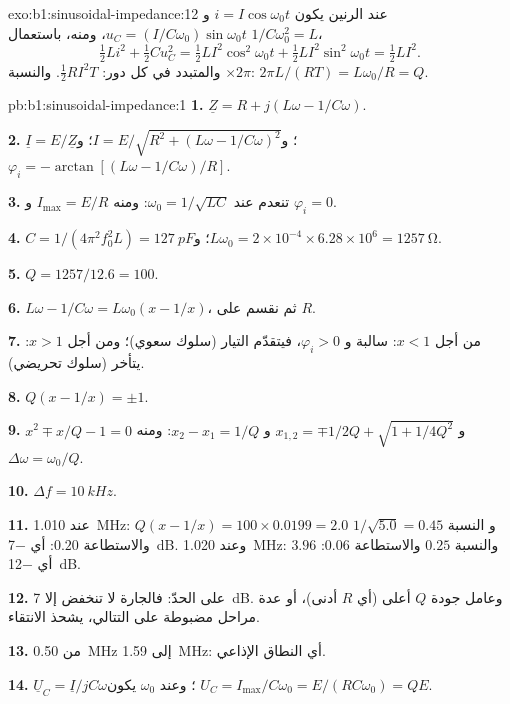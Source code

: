 \begin{solution}{exo:b1:sinusoidal-impedance:12}
عند الرنين يكون $i = I\cos\omega_0 t$ و $u_C = (I/C\omega_0)\sin\omega_0 t$،
ومنه، باستعمال $1/C\omega_0^2 = L$،
\[
\tfrac12 Li^2 + \tfrac12 Cu_C^2 = \tfrac12 LI^2\cos^2\omega_0 t
+ \tfrac12 LI^2\sin^2\omega_0 t = \tfrac12 LI^2 .
\]
والمتبدد في كل دور: $\tfrac12 RI^2T$. والنسبة $\times 2\pi$: $2\pi L/(RT)
= L\omega_0/R = Q$.
\end{solution}

\begin{solution}{pb:b1:sinusoidal-impedance:1}
\textbf{1.} $\underline Z = R + j(L\omega - 1/C\omega)$.

\textbf{2.} $\underline I = E/\underline Z$؛ و$I = E/\sqrt{R^2 + (L\omega -
1/C\omega)^2}$؛ و$\varphi_i = -\arctan[(L\omega - 1/C\omega)/R]$.

\textbf{3.} تنعدم  عند $\omega_0 = 1/\sqrt{LC}$: ومنه $I_{\max}
= E/R$ و $\varphi_i = 0$.

\textbf{4.} $C = 1/(4\pi^2f_0^2L) = \qty{127}{pF}$؛ و$L\omega_0 = 2\times10^{-4}
\times 6.28\times10^6 = \qty{1257}{\ohm}$.

\textbf{5.} $Q = 1257/12.6 = 100$.

\textbf{6.} $L\omega - 1/C\omega = L\omega_0(x - 1/x)$، ثم نقسم على $R$.

\textbf{7.} من أجل $x < 1$:  سالبة و $\varphi_i > 0$، فيتقدّم التيار
(سلوك سعوي)؛ ومن أجل $x > 1$: يتأخر (سلوك تحريضي).

\textbf{8.} $Q(x - 1/x) = \pm1$.

\textbf{9.} $x^2 \mp x/Q - 1 = 0$ و $x_{1,2} = \mp1/2Q + \sqrt{1 + 1/4Q^2}$ و
$x_2 - x_1 = 1/Q$: ومنه $\Delta\omega = \omega_0/Q$.

\textbf{10.} $\Delta f = \qty{10}{kHz}$.

\textbf{11.} عند \qty{1.010}{MHz}: $Q(x - 1/x) = 100 \times 0.0199 = 2.0$ و
النسبة $1/\sqrt{5.0} = 0.45$ والاستطاعة $0.20$: أي \qty{-7}{dB}. وعند \qty{1.020}{MHz}:
$3.96$ والنسبة $0.25$ والاستطاعة $0.06$: أي \qty{-12}{dB}.

\textbf{12.} على الحدّ: فالجارة لا تنخفض إلا \qty{7}{dB}. وعامل جودة
$Q$ أعلى (أي $R$ أدنى)، أو عدة مراحل مضبوطة على التتالي، يشحذ
الانتقاء.

\textbf{13.} من \qty{0.50}{MHz} إلى \qty{1.59}{MHz}: أي النطاق الإذاعي.

\textbf{14.} $\underline U_C = \underline I/jC\omega$؛ وعند $\omega_0$ يكون
$U_C = I_{\max}/C\omega_0 = E/(RC\omega_0) = QE$.


\end{solution}
